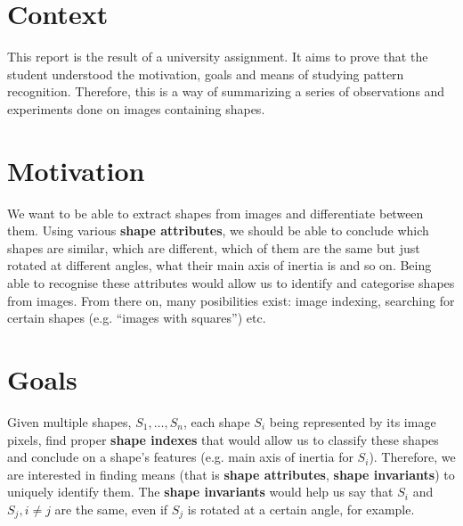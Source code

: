 \section{Context}
This report is the result of a university assignment. It aims to prove that the student understood the motivation, goals and means of studying pattern recognition. Therefore, this is a way of summarizing a series of observations and experiments done on images containing shapes.

\section{Motivation}
We want to be able to extract shapes from images and differentiate between them. Using various \textbf{shape attributes}, we should be able to conclude which shapes are similar, which are different, which of them are the same but just rotated at different angles, what their main axis of inertia is and so on. Being able to recognise these attributes would allow us to identify and categorise shapes from images. From there on, many posibilities exist: image indexing, searching for certain shapes (e.g. ``images with squares'') etc.


\section{Goals}
Given multiple shapes, $S_1, \dots, S_n$, each shape $S_i$ being represented by its image pixels, find proper \textbf{shape indexes} that would allow us to classify these shapes and conclude on a shape's features (e.g. main axis of inertia for $S_i$). Therefore, we are interested in finding means (that is \textbf{shape attributes}, \textbf{shape invariants}) to uniquely identify them. The \textbf{shape invariants} would help us say that $S_i$ and $S_j, i \neq j$ are the same, even if $S_j$ is rotated at a certain angle, for example.